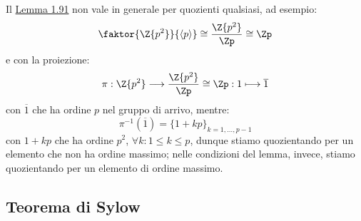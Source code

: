 \documentclass[11pt]{scrartcl}
\begin{document}
\begin{remark}
    Il \hyperref[l:1.91]{Lemma 1.91} non vale in generale per quozienti qualsiasi, ad esempio:
        \[ \faktor{\Z{p^2}}{\left<p\right>} \cong \frac{\Z{p^2}}{\Zp}\cong \Zp
            \]
    e con la proiezione:
        \[ \pi: \Z{p^2} \longrightarrow \frac{\Z{p^2}}{\Zp} \cong \Zp : 1 \longmapsto \overline 1
            \]
    con $\overline 1$ che ha ordine $p$ nel gruppo di arrivo, mentre:
        \[ \pi^{-1}(\overline 1) = \{1 + kp\}_{k = 1,\ldots,p-1}
            \]
    con $1+kp$ che ha ordine $p^2$, $\forall k : 1 \leq k \leq p$, dunque stiamo quozientando per un elemento che non ha ordine massimo;
     nelle condizioni del lemma, invece, stiamo quozientando per un elemento di ordine massimo.
\end{remark}


\newpage
\subsection{Teorema di Sylow}
\end{document}
